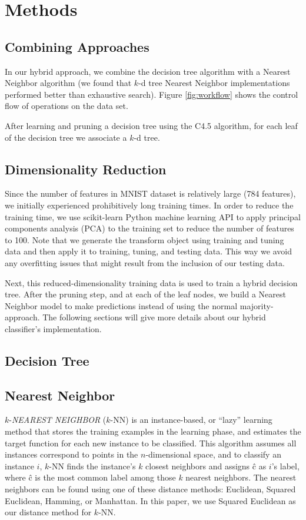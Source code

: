 \section{Methods}
\subsection{Combining Approaches}
In our hybrid approach, we combine the decision tree algorithm with a Nearest Neighbor algorithm (we found that $k$-d tree Nearest Neighbor implementations performed better than exhaustive search). Figure \ref{fig:workflow} shows the control flow of operations on the data set.

After learning and pruning a decision tree using the C4.5 algorithm, for each leaf of the decision tree we associate a $k$-d tree.

\subsection{Dimensionality Reduction}
Since the number of features in MNIST dataset is relatively large (784 features), we initially experienced prohibitively long training times. In order to reduce the training time, we use scikit-learn Python machine learning API to apply principal components analysis (PCA) to the training set to reduce the number of features to 100. Note that we generate the transform object using training and tuning data and then apply it to training, tuning, and testing data.  This way we avoid any overfitting issues that might result from the inclusion of our testing data.

Next, this reduced-dimensionality training data is used to train a hybrid decision tree. After the pruning step, and at each of the leaf nodes, we build a Nearest Neighbor model to make predictions instead of using the normal majority-approach. The following sections will give more details about our hybrid classifier's implementation.

\subsection{Decision Tree}

\subsection{Nearest Neighbor}
$k$-\textit{NEAREST NEIGHBOR} ($k$-NN) is an instance-based, or ``lazy'' learning method that stores the training examples in the learning phase, and estimates the target function for each new instance to be classified. This algorithm assumes all instances correspond to points in the $n$-dimensional space, and to classify an instance $i$, $k$-NN finds the instance's $k$ closest neighbors and assigns \^{c} as $i$'s label, where \^{c} is the most common label among those $k$ nearest neighbors. The nearest neighbors can be found using one of these distance methods: Euclidean, Squared Euclidean, Hamming, or Manhattan. In this paper, we use Squared Euclidean as our distance method for $k$-NN.
